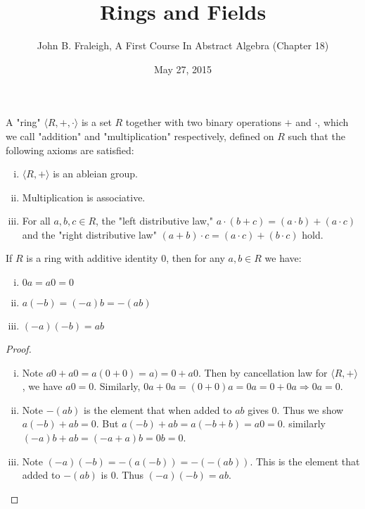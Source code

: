 \documentclass[a4paper,11pt]{article}
\title{Rings and Fields}
\author{John B. Fraleigh, A First Course In Abstract Algebra (Chapter 18)}
\date{May 27, 2015}
\begin{document}
\maketitle
{}

\begin{outline}

    A "ring" \(\langle R, +, \cdot \rangle\) is a set \(R\) together with two binary operations
    \(+\) and \(\cdot\), which we call "addition" and "multiplication" respectively, defined on \(R\) such that the
    following axioms are satisfied:
    \begin{enumerate}[i.]
      \item \(\langle R, + \rangle\) is an ableian group.
      \item Multiplication is associative.
      \item For all \(a, b, c \in R\), the "left distributive law," \(a \cdot (b + c) = (a \cdot b) + (a \cdot c)\) and
      the "right distributive law" \((a + b) \cdot c = (a \cdot c) + (b \cdot c)\) hold.
    \end{enumerate}

    If \(R\) is a ring with additive identity \(0\), then for any \(a, b \in R\) we have:
    \begin{enumerate}[i.]
      \item \(0a = a0 = 0\)
      \item \(a(-b) = (-a)b = -(ab)\)
      \item \((-a)(-b) = ab\)
    \end{enumerate}
    
    \begin{proof}
      \begin{enumerate}[i.]
        \item 
          Note \(a0 + a0 = a(0 + 0) = a) = 0 + a0\). Then by cancellation law for \(\langle R, + \rangle\), we have 
          \(a0 = 0\). Similarly, \(0a + 0a = (0 + 0)a = 0a = 0 + 0a \Rightarrow 0a = 0\).
        \item 
          Note \(-(ab)\) is the element that when added to \(ab\) gives \(0\). Thus we show \(a(-b) + ab = 0\). But
          \(a(-b) + ab = a(-b + b) = a0 = 0\). similarly \((-a)b + ab = (-a + a)b = 0b = 0\).
        \item 
          Note \((-a)(-b) = -(a(-b)) = -(-(ab))\). This is the element that added to \(-(ab)\) is \(0\). Thus
          \((-a)(-b) = ab\).
      \end{enumerate}
    \end{proof}
      

\end{outline}
\end{document}
